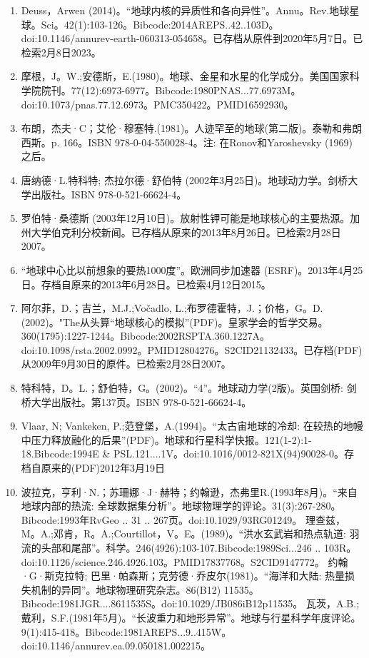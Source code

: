 \begin{enumerate}
\item Deuss，Arwen (2014)。“地球内核的异质性和各向异性”。Annu。Rev.地球星球。Sci。42(1):103-126。Bibcode:2014AREPS..42..103D。doi:10.1146/annurev-earth-060313-054658。已存档从原件到2020年5月7日。已检索2月8日2023。
\item 摩根，J。W.;安德斯，E.(1980)。地球、金星和水星的化学成分。美国国家科学院院刊。77(12):6973-6977。Bibcode:1980PNAS...77.6973M。doi:10.1073/pnas.77.12.6973。PMC350422。PMID16592930。  
\item 布朗，杰夫·C；艾伦·穆塞特.(1981)。人迹罕至的地球(第二版)。泰勒和弗朗西斯。p. 166。ISBN 978-0-04-550028-4。注: 在Ronov和Yaroshevsky (1969) 之后。
\item 唐纳德·L.特科特; 杰拉尔德·舒伯特 (2002年3月25日)。地球动力学。剑桥大学出版社。ISBN 978-0-521-66624-4。
\item 罗伯特·桑德斯 (2003年12月10日)。放射性钾可能是地球核心的主要热源。加州大学伯克利分校新闻。已存档从原来的2013年8月26日。已检索2月28日2007。
\item “地球中心比以前想象的要热1000度”。欧洲同步加速器 (ESRF)。2013年4月25日。存档自原来的2013年6月28日。已检索4月12日2015。
\item 阿尔菲，D.；吉兰，M.J.;Vočadlo, L.;布罗德霍特，J.；价格，G。D.(2002)。"The从头算“地球核心的模拟”(PDF)。皇家学会的哲学交易。360(1795):1227-1244。Bibcode:2002RSPTA.360.1227A。doi:10.1098/rsta.2002.0992。PMID12804276。S2CID21132433。已存档(PDF)从2009年9月30日的原件。已检索2月28日2007。   
\item 特科特，D。L.；舒伯特，G。(2002)。“4”。地球动力学(2版)。英国剑桥: 剑桥大学出版社。第137页。ISBN 978-0-521-66624-4。
\item Vlaar, N; Vankeken, P.;范登堡，A.(1994)。“太古宙地球的冷却: 在较热的地幔中压力释放融化的后果”(PDF)。地球和行星科学快报。121(1-2):1-18.Bibcode:1994E & PSL.121....1V。doi:10.1016/0012-821X(94)90028-0。存档自原来的(PDF)2012年3月19日
\item 波拉克，亨利·N.；苏珊娜·J·赫特；约翰逊，杰弗里R.(1993年8月)。“来自地球内部的热流: 全球数据集分析”。地球物理学的评论。31(3):267-280。Bibcode:1993年RvGeo .. 31 .. 267页。doi:10.1029/93RG01249。
 理查兹，M。A.;邓肯，R。A.;Courtillot，V。E。(1989)。“洪水玄武岩和热点轨道: 羽流的头部和尾部”。科学。246(4926):103-107.Bibcode:1989Sci...246 .. 103R。doi:10.1126/science.246.4926.103。PMID17837768。S2CID9147772。  
 约翰·G·斯克拉特; 巴里·帕森斯；克劳德·乔皮尔(1981)。“海洋和大陆: 热量损失机制的异同”。地球物理研究杂志。86(B12) 11535。Bibcode:1981JGR....8611535S。doi:10.1029/JB086iB12p11535。
 瓦茨，A.B.;戴利，S.F.(1981年5月)。“长波重力和地形异常”。地球与行星科学年度评论。9(1):415-418。Bibcode:1981AREPS...9..415W。doi:10.1146/annurev.ea.09.050181.002215。

\end{enumerate}
